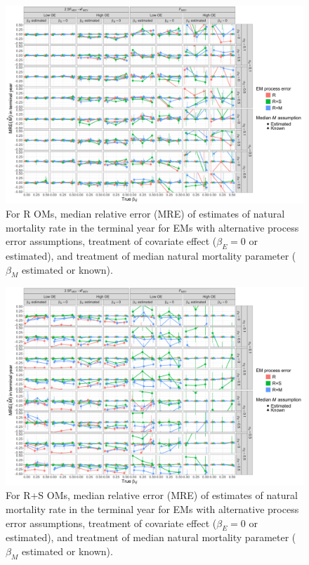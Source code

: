 \documentclass[
  12pt,
]{article}
\begin{document}
\begin{landscape}
\begin{figure}
\begin{center}
\includegraphics[height = \textheight]{terminal_year_M_bias_Rom}
\end{center}
\caption{For R OMs, median relative error (MRE) of estimates of natural mortality rate in the terminal year for EMs with alternative process error assumptions, treatment of covariate effect ($\beta_E = 0$ or estimated), and treatment of median natural mortality parameter ($\beta_M$ estimated or known).}\label{terminal_M_bias_Rom}
\end{figure}
\end{landscape}

\begin{landscape}
\begin{figure}
\begin{center}
\includegraphics[height = \textheight]{terminal_year_M_bias_RSom}
\end{center}
\caption{For R+S OMs, median relative error (MRE) of estimates of natural mortality rate in the terminal year for EMs with alternative process error assumptions, treatment of covariate effect ($\beta_E = 0$ or estimated), and treatment of median natural mortality parameter ($\beta_M$ estimated or known).}\label{terminal_M_bias_RSom}
\end{figure}
\end{landscape}
\end{document}
